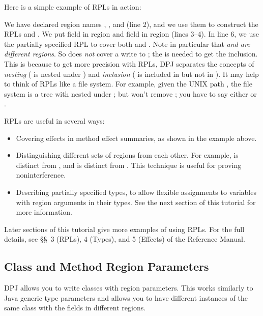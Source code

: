 Here is a simple example of RPLs in action:
%

%
We have declared region names , , and  (line 2),
and we use them to construct the RPLs  and .  We put
field  in region  and field  in region
 (lines 3--4).  In line 6, we use the partially specified RPL
 to cover both  and .  Note in particular
that \emph{ and  are different regions}.  So
 does \emph{not} cover a write to ; the \kwd{*}
is needed to get the inclusion.  This is because to get more precision
with RPLs, DPJ separates the concepts of \emph{nesting} ( is
nested under ) and \emph{inclusion} ( is included in
 but not in ).  It may help to think of RPLs like a
file system.  For example, given the UNIX path , the file
system is a tree with  nested under ; but  won't remove ; you have to say either 
or .

RPLs are useful in several ways:
%
\begin{itemize}
%
\item Covering effects in method effect summaries, as shown in the
  example above.
%
\item Distinguishing different sets of regions from each other.  For
  example,  is distinct from , and  is
  distinct from .  This technique is useful for proving
  noninterference.
%
\item Describing partially specified types, to allow flexible
  assignments to variables with region arguments in their types.  See
  the next section of this tutorial for more information.
%
\end{itemize}
%
Later sections of this tutorial give more examples of using RPLs.  For
the full details, see \S\S~3 (RPLs), 4 (Types), and 5 (Effects) of the
Reference Manual.

\subsection{Class and Method Region Parameters%
\label{sec:overview:params}}

 DPJ allows you to write classes with
region parameters.  This works similarly to Java generic type
parameters and allows you to have different instances of the same
class with the fields in different regions.

